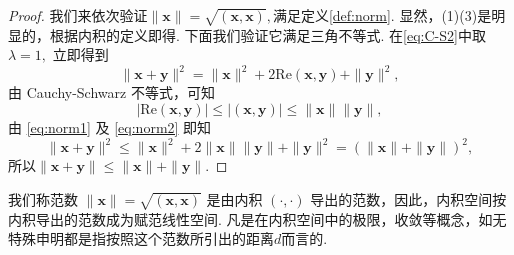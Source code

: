 \documentclass[12pt, a4paper,newtx]{ctexart}
\begin{document}
\begin{proof}
	我们来依次验证$\|\bm x\|= \sqrt{(\bm x, \bm x)},$满足定义\ref{def:norm}. 显然，(1)(3)是明显的，根据内积的定义即得. 下面我们验证它满足三角不等式. 
	 在\eqref{eq:C-S2}中取 $\lambda = 1,$ 立即得到
	 \begin{equation}\label{eq:norm1}
	 	\|\bm x + \bm y\|^2 = \|\bm x\|^2 + 2 \text{Re}(\bm x, \bm y) + \|\bm y\|^2,
	 \end{equation}
	由 Cauchy-Schwarz 不等式，可知
	\begin{equation}\label{eq:norm2}
		|\text{Re}(\bm x, \bm y)| \leqslant |(\bm x,\bm y)| \leqslant \|\bm x\| \|\bm y\|,
	\end{equation}
	由 \eqref{eq:norm1} 及 \eqref{eq:norm2} 即知
	\[
	\|\bm x + \bm y\|^2 \leqslant \|\bm x\|^2 + 2 \|\bm x\| \|\bm y\| + \|\bm y\|^2 = (\|\bm x\| + \|\bm y\|)^2,
	\]
	所以$\|\bm x + \bm y\| \leqslant \|\bm x\| + \|\bm y\|.$
\end{proof}
我们称范数 $\|\bm x\| = \sqrt{(\bm x, \bm x)}$ 是由内积 $(·,·)$ 导出的范数，因此，内积空间按内积导出的范数成为赋范线性空间. 凡是在内积空间中的极限，收敛等概念，如无特殊申明都是指按照这个范数所引出的距离$d$而言的. 
\end{document}
